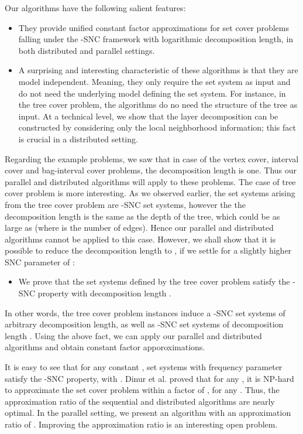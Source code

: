 \documentclass[11pt]{article}
\begin{document}
Our algorithms have the following salient features:
\begin{itemize}
\item
They provide unified constant factor approximations for set cover problems falling under the -SNC 
framework with logarithmic decomposition length, in both distributed and parallel settings.
\item
A surprising and interesting characteristic of these algorithms is that they are model independent. 
Meaning, they only require the set system as input and do not need the underlying model defining the set system.
For instance, in the tree cover problem, the algorithms do no need the structure of the tree as input.
At a technical level, we show that the layer decomposition can be constructed by considering only the local 
neighborhood information; this fact is crucial in a distributed setting.
\end{itemize}

Regarding the example problems, we saw that in case of the vertex cover, interval cover and bag-interval cover problems,
the decomposition length is one. Thus our parallel and distributed algorithms will apply to these problems.
The case of tree cover problem is more interesting.
As we observed earlier, the set systems arising from the tree cover problem are -SNC set systems,
however the the decomposition length is the same as the depth of the tree, 
which could be as large as  (where  is the number of edges). 
Hence our parallel and distributed algorithms cannot be applied to this case.
However, we shall show that it is possible to reduce the decomposition length to , 
if we settle for a slightly higher SNC parameter of :
\begin{itemize}
\item
We prove that the set systems
defined by the tree cover problem satisfy the -SNC property with decomposition length .
\end{itemize}
In other words, the tree cover problem instances induce a -SNC set systems
of arbitrary decomposition length, as well as -SNC set systems of decomposition length .
Using the above fact, we can apply our parallel and distributed algorithms and obtain constant factor apporoximations.

It is easy to see that for any constant , set systems with frequency parameter 
satisfy the -SNC property, with .
Dinur et al. \cite{Hypergraph-Hardness} proved that for any , 
it is NP-hard to approximate the set cover problem within a factor of , for any .
Thus, the approximation ratio of the sequential and distributed algorithms are nearly optimal.
In the parallel setting, we present an algorithm with an approximation ratio of .
Improving the approximation ratio is an interesting open problem.
\end{document}
